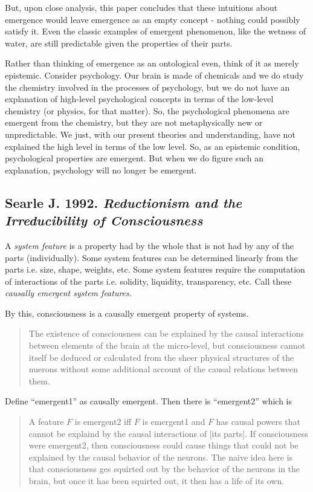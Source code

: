 \documentclass{article}
\newcommand{\ti}[1]{\textit{#1}}
\newcommand{\annbibtitle}[2]{\subsection*{#1. \ti{#2}}}
\begin{document}
But, upon close analysis, this paper concludes that these intuitions about emergence would leave emergence as an empty concept - nothing could possibly satisfy it. Even the classic examples of emergent phenomenon, like the wetness of water, are still predictable given the properties of their parts.

Rather than thinking of emergence as an ontological even, think of it as merely epistemic. Consider psychology. Our brain is made of chemicals and we do study the chemistry involved in the processes of psychology, but we do not have an explanation of high-level psychological concepts in terms of the low-level chemistry (or physics, for that matter). So, the psychological phenomena are emergent from the chemistry, but they are not metaphysically new or unpredictable. We just, with our present theories and understanding, have not explained the high level in terms of the low level. So, as an epistemic condition, psychological properties are emergent. But when we do figure such an explanation, psychology will no longer be emergent.

\annbibtitle{Searle J. 1992}{Reductionism and the Irreducibility of Consciousness}

A \ti{system feature} is a property had by the whole that is not had by any of the parts (individually). Some system features can be determined linearly from the parts i.e. size, shape, weights, etc. Some system features require the computation of interactions of the parts i.e. solidity, liquidity, transparency, etc. Call these \ti{causally emergent system features}.

By this, consciousness is a causally emergent property of systems.
\begin{quote}
The existence of consciousness can be explained by the causal interactions between elements of the brain at the micro-level, but consciousness cannot itself be deduced or calculated from the sheer physical structures of the nuerons without some additional account of the causal relations between them.
\end{quote}

Define ``emergent1'' as causally emergent. Then there is ``emergent2'' which is

\begin{quote}
A feature $F$ is emergent2 iff $F$ is emergent1 and $F$ has causal powers that cannot be explaind by the causal interactions of [its parts]. If consciousness were emergent2, then consciousness could cause things that could not be explained by the causal behavior of the neurons. The naive idea here is that consciousness ges squirted out by the behavior of the neurons in the brain, but once it has been squirted out, it then has a life of its own.
\end{quote}
\end{document}
